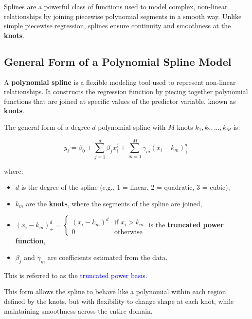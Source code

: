 \documentclass[
  letterpaper,
  DIV=11,
  numbers=noendperiod]{scrreprt}
\providecommand{\tightlist}{%
  \setlength{\itemsep}{0pt}\setlength{\parskip}{0pt}}\usepackage{longtable,booktabs,array}
\begin{document}

Splines are a powerful class of functions used to model complex,
non-linear relationships by joining piecewise polynomial segments in a
smooth way. Unlike simple piecewise regression, splines ensure
continuity and smoothness at the \textbf{knots}.

\hypertarget{general-form-of-a-polynomial-spline-model}{%
\subsection*{General Form of a Polynomial Spline
Model}\label{general-form-of-a-polynomial-spline-model}}

A \textbf{polynomial spline} is a flexible modeling tool used to
represent non-linear relationships. It constructs the regression
function by piecing together polynomial functions that are joined at
specific values of the predictor variable, known as \textbf{knots}.

The general form of a degree-\(d\) polynomial spline with \(M\) knots
\(k_1, k_2, \dots, k_M\) is:

\[
y_i = \beta_0 + \sum_{j=1}^d \beta_j x_i^j + \sum_{m=1}^M \gamma_m (x_i - k_m)^d_{+}
\]

where:

\begin{itemize}
\tightlist
\item
  \(d\) is the degree of the spline (e.g., 1 = linear, 2 = quadratic, 3
  = cubic),
\item
  \(k_m\) are the \textbf{knots}, where the segments of the spline are
  joined,
\item
  \((x_i - k_m)^d_{+} = \begin{cases}(x_i - k_m)^d & \text{if } x_i > k_m \\ 0 & \text{otherwise} \end{cases}\)
  is the \textbf{truncated power function},
\item
  \(\beta_j\) and \(\gamma_m\) are coefficients estimated from the data.
\end{itemize}

This is referred to as the \textcolor{blue}{truncated power basis}.

This form allows the spline to behave like a polynomial within each
region defined by the knots, but with flexibility to change shape at
each knot, while maintaining smoothness across the entire domain.
\end{document}
